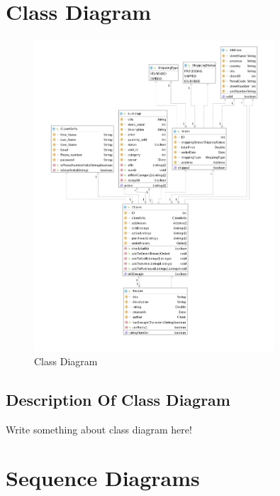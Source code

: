 \documentclass[11pt]{article}
\begin{document}
\section{Class Diagram}
\begin{figure}[ht!]
    \centering
    \includegraphics[width=0.8\textwidth]{Diagrams/Class/class_diagram.png} 
    \caption{Class Diagram}
    \label{fig: Class diagram}
\end{figure}

\subsection{Description Of Class Diagram}
Write something about class diagram here!

\section{Sequence Diagrams}
\end{document}
